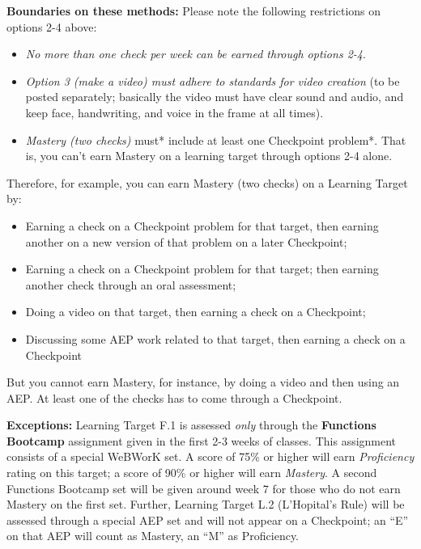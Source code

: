 \documentclass[]{article}
\providecommand{\tightlist}{%
  \setlength{\itemsep}{0pt}\setlength{\parskip}{0pt}}
\begin{document}
\textbf{Boundaries on these methods:} Please note the following
restrictions on options 2-4 above:

\begin{itemize}
\tightlist
\item
  \emph{No more than one check per week can be earned through options
  2-4}.
\item
  \emph{Option 3 (make a video) must adhere to standards for video
  creation} (to be posted separately; basically the video must have
  clear sound and audio, and keep face, handwriting, and voice in the
  frame at all times).
\item
  \emph{Mastery (two checks) }must* include at least one Checkpoint
  problem*. That is, you can't earn Mastery on a learning target through
  options 2-4 alone.
\end{itemize}

Therefore, for example, you can earn Mastery (two checks) on a Learning
Target by:

\begin{itemize}
\tightlist
\item
  Earning a check on a Checkpoint problem for that target, then earning
  another on a new version of that problem on a later Checkpoint;
\item
  Earning a check on a Checkpoint problem for that target; then earning
  another check through an oral assessment;
\item
  Doing a video on that target, then earning a check on a Checkpoint;
\item
  Discussing some AEP work related to that target, then earning a check
  on a Checkpoint
\end{itemize}

But you cannot earn Mastery, for instance, by doing a video and then
using an AEP. At least one of the checks has to come through a
Checkpoint.

\textbf{Exceptions:} Learning Target F.1 is assessed \emph{only} through
the \textbf{Functions Bootcamp} assignment given in the first 2-3 weeks
of classes. This assignment consists of a special WeBWorK set. A score
of 75\% or higher will earn \emph{Proficiency} rating on this target; a
score of 90\% or higher will earn \emph{Mastery}. A second Functions
Bootcamp set will be given around week 7 for those who do not earn
Mastery on the first set. Further, Learning Target L.2 (L'Hopital's
Rule) will be assessed through a special AEP set and will not appear on
a Checkpoint; an ``E'' on that AEP will count as Mastery, an ``M'' as
Proficiency.
\end{document}

